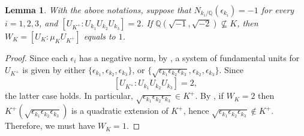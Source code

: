 \documentclass[12pt]{amsart}
\newtheorem{lemma}[theorem]{Lemma}
\theoremstyle{definition}
\numberwithin{equation}{section}
\begin{document}
\begin{lemma} \label{lemma, root-epsilon}
With the above notations, suppose that $N_{k_i/\mathbb{Q}}(\epsilon_{k_i})=-1$ for every $i=1,2,3$, and $\left[U_{K^+}:U_{k_1}U_{k_2}U_{k_3}\right]=2$. If $\mathbb{Q}(\sqrt{-1},\sqrt{-2}) \not \subseteq K$, then  $W_K=\left[U_K : \mu_K U_{K^+}\right]$ equals to $1$.
\end{lemma}


\begin{proof}
Since each $\epsilon_i$ has a negative norm, by \cite[Satz 1]{Kubota}, a system of fundamental units for $U_{K^+}$ is  given by either  $\{\epsilon_{k_1},\epsilon_{k_2},\epsilon_{k_3}\}$, or  $\{\sqrt{\epsilon_{k_1} \epsilon_{k_2} \epsilon_{k_3}}, \epsilon_{k_2},\epsilon_{k_3}\}$. Since
\begin{equation*}
	 \left[U_{K^+}:U_{k_1}U_{k_2}U_{k_3}\right] = 2,
\end{equation*}
the latter case holds.
In particular, $\sqrt{\epsilon_{k_1} \epsilon_{k_2} \epsilon_{k_3}} \in K^+$. By \cite[Proof of Theorem 1, Case (4)]{Hirabayashi}, if $W_K=2$ then $K^+(\sqrt{\epsilon_{k_1} \epsilon_{k_2} \epsilon_{k_3}})$ is a quadratic extension of $K^+$, hence $\sqrt{\epsilon_{k_1} \epsilon_{k_2} \epsilon_{k_3}} \not \in K^+$. Therefore, we must have $W_K=1$.
\end{proof}
\end{document}
